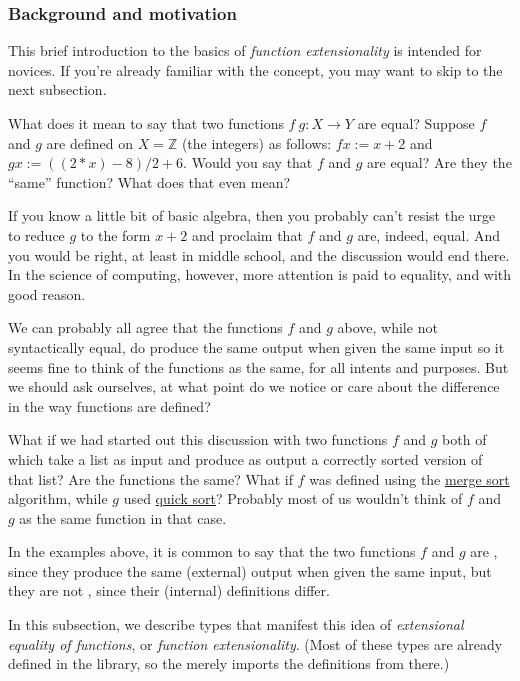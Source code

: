 \subsubsection{Background and motivation}\label{background-and-motivation}
This brief introduction to the basics of \emph{function extensionality} is intended for novices. If you're already familiar with the concept, you may want to skip to the next subsection.

What does it mean to say that two functions \(f\ g \colon X → Y\) are equal? Suppose $f$ and \(g\) are defined on \(X = ℤ\) (the integers) as follows: \(f x := x + 2\) and \(g x := ((2 * x) - 8)/2 + 6\). Would you say that \(f\) and \(g\) are equal?  Are they the ``same'' function?  What does that even mean?

If you know a little bit of basic algebra, then you probably can't resist the urge to reduce \(g\) to the form \(x + 2\) and proclaim that \(f\) and \(g\) are, indeed, equal. And you would be right, at least in middle school,
and the discussion would end there. In the science of computing, however, more attention is paid to equality, and with good reason.

We can probably all agree that the functions \(f\) and \(g\) above, while not syntactically equal, do produce the same output when given the same input so it seems fine to think of the functions as the same, for all intents and purposes. But we should ask ourselves, at what point do we notice or care about the difference in the way functions are defined?

What if we had started out this discussion with two functions \(f\) and \(g\) both of which take a list as input and produce as output a correctly sorted version of that list? Are the functions the same? What if \(f\) was defined using the \href{https://en.wikipedia.org/wiki/Merge_sort}{merge sort} algorithm, while \(g\) used \href{https://en.wikipedia.org/wiki/Quicksort}{quick sort}? Probably most of us wouldn't think of \(f\) and \(g\) as the same function in that case.

In the examples above, it is common to say that the two functions \(f\) and \(g\) are \href{https://en.wikipedia.org/wiki/Extensionality}{}, since they produce the same (external) output when given the same input, but they are not \href{https://en.wikipedia.org/wiki/Intension}{}, since their (internal) definitions differ.

In this subsection, we describe types that manifest this idea of \emph{extensional equality of functions}, or \emph{function extensionality}. (Most of these types are already defined in the \typetopology library, so the \ualib merely imports the definitions from there.)


